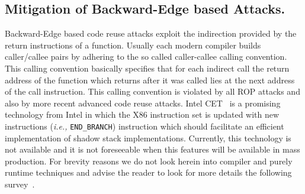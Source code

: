 % 
% 

\subsection{Mitigation of Backward-Edge based Attacks.}
Backward-Edge based code reuse attacks exploit the indirection provided by the return instructions 
of a function. Usually each modern compiler builds caller/callee pairs by adhering to the so called caller-callee
calling convention. This calling convention basically specifies that for each indirect call the return address of the function which returns after 
it was called lies at the next address of the call instruction. 
This calling convention is violated by all ROP attacks and also by 
more recent advanced code reuse attacks. 
Intel CET~\cite{intel:cet} is a promising technology from Intel in which the X86 instruction set is updated with new instructions (\textit{i.e.,} \texttt{END\_BRANCH}) instruction
which should facilitate an efficient implementation of shadow stack implementations. Currently, this technology is not available and it is not foreseeable when this features will 
be available in mass production.
For brevity reasons we do not look herein into compiler and purely runtime techniques and advise the reader to look for 
more details the following survey~\cite{cfi_survey_payer}.

